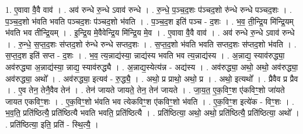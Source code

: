 \documentclass[17pt]{extarticle}
\begin{document}
1. ए॒वावा वै॒वै वाव॑ । . अव॑ रुन्धे रु॒न्धे ऽवाव॑ रुन्धे । . रु॒न्धे॒ प॒ञ्च॒द॒शः प॑ञ्चद॒शो रु॑न्धे रुन्धे पञ्चद॒शः । . प॒ञ्च॒द॒शो भ॑वति भवति पञ्चद॒शः प॑ञ्चद॒शो भ॑वति । . प॒ञ्च॒द॒श इति॑ पञ्च - द॒शः । . भ॒व॒ ती॒न्द्रि॒य मि॑न्द्रि॒यम् भ॑वति भव तीन्द्रि॒यम् । . इ॒न्द्रि॒य मे॒वैवेन्द्रि॒य मि॑न्द्रि॒य मे॒व । . ए॒वावा वै॒वै वाव॑ । . अव॑ रुन्धे रु॒न्धे ऽवाव॑ रुन्धे । . रु॒न्धे॒ स॒प्त॒द॒शः स॑प्तद॒शो रु॑न्धे रुन्धे सप्तद॒शः । . स॒प्त॒द॒शो भ॑वति भवति सप्तद॒शः स॑प्तद॒शो भ॑वति । . स॒प्त॒द॒श इति॑ सप्त - द॒शः । . भ॒व॒ त्य॒न्नाद्य॑स्या॒ न्नाद्य॑स्य भवति भव त्य॒न्नाद्य॑स्य । . अ॒न्नाद्य॒ स्याव॑रुद्ध्या॒ अव॑रुद्ध्या अ॒न्नाद्य॑स्या॒ न्नाद्य॒ स्याव॑रुद्ध्यै । . अ॒न्नाद्य॒स्येत्य॑न्न - अद्य॑स्य । . अव॑रुद्ध्या॒ अथो॒ अथो॒ अव॑रुद्ध्या॒ अव॑रुद्ध्या॒ अथो᳚ । . अव॑रुद्ध्या॒ इत्यव॑ - रु॒द्ध्यै॒ । . अथो॒ प्र प्राथो॒ अथो॒ प्र । . अथो॒ इत्यथो᳚ । . प्रैवैव प्र प्रैव । . ए॒व तेन॒ तेनै॒वैव तेन॑ । . तेन॑ जायते जायते॒ तेन॒ तेन॑ जायते । . जा॒य॒त॒ ए॒क॒विꣳ॒॒श ए॑कविꣳ॒॒शो जा॑यते जायत एकविꣳ॒॒शः । . ए॒क॒विꣳ॒॒शो भ॑वति भव त्येकविꣳ॒॒श ए॑कविꣳ॒॒शो भ॑वति । . ए॒क॒विꣳ॒॒श इत्ये॑क - विꣳ॒॒शः । . भ॒व॒ति॒ प्रति॑ष्ठित्यै॒ प्रति॑ष्ठित्यै भवति भवति॒ प्रति॑ष्ठित्यै । . प्रति॑ष्ठित्या॒ अथो॒ अथो॒ प्रति॑ष्ठित्यै॒ प्रति॑ष्ठित्या॒ अथो᳚ । . प्रति॑ष्ठित्या॒ इति॒ प्रति॑ - स्थि॒त्यै॒ । \newline
\end{document}
